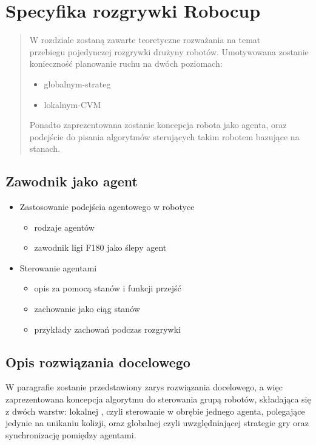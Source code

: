 \chapter{Specyfika rozgrywki Robocup}
\begin{abstract}
W rozdziale zostaną zawarte teoretyczne rozważania na temat \\przebiegu pojedynczej 
rozgrywki drużyny robotów.
Umotywowana zostanie konieczność planowanie ruchu na dwóch poziomach:
	\begin{itemize}
	\item globalnym-strateg
	\item lokalnym-CVM 
	\end{itemize}
Ponadto zaprezentowana zostanie koncepcja robota jako agenta, oraz podejście do pisania algorytmów sterujących takim 
robotem  bazujące na stanach.
\end{abstract}

	\section{Zawodnik jako agent }
	\begin{itemize}
	 \item Zastosowanie podejścia agentowego w robotyce
		\begin{itemize}
		 \item rodzaje agentów
		 \item zawodnik ligi F180 jako ślepy agent
		\end{itemize}
	 \item Sterowanie agentami
		\begin{itemize}
		 \item opis za pomocą  stanów i funkcji przejść
		 \item zachowanie jako ciąg stanów
		 \item przykłady zachowań podczas rozgrywki
		\end{itemize}

	\end{itemize}

	\section{Opis rozwiązania docelowego}
	W paragrafie zostanie przedstawiony zarys rozwiązania docelowego, a więc  zaprezentowana koncepcja algorytmu
	do sterowania grupą robotów, składająca się z dwóch warstw: lokalnej , czyli sterowanie w obrębie jednego
 	agenta, polegające jedynie na unikaniu kolizji, oraz globalnej czyli uwzględniającej strategie gry oraz
	synchronizację pomiędzy agentami.
